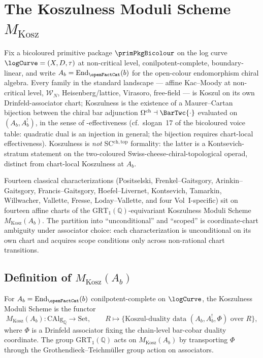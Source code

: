 \chapter{The Koszulness Moduli Scheme $M_{\mathrm{Kosz}}$}
\label{chap:koszulness-moduli}

Fix a bicoloured primitive package $\primPkgBicolour$ on the log curve
$\logCurve = (X, D, \tau)$ at non-critical level, conilpotent-complete,
boundary-linear, and write $A_b = \mathrm{End}_{\openFactCat}(b)$ for the
open-colour endomorphism chiral algebra. Every family in the standard
landscape — affine Kac--Moody at non-critical level, $\mathcal{W}_N$,
Heisenberg/lattice, Virasoro, free-field — is Koszul on its own
Drinfeld-associator chart; Koszulness is the existence of a Maurer--Cartan
bijection between the chiral bar adjunction $\Omega^{\mathrm{ch}} \dashv
\BarTwc{\cdot}$ evaluated on $(A_b, A_b^{!})$, in the sense of
\effKoszul-effectiveness (cf.\ slogan~17 of the bicoloured voice
table: quadratic dual is an injection in general; the bijection requires
chart-local effectiveness). Koszulness is \emph{not} SC$^{\mathrm{ch,top}}$
formality: the latter is a Kontsevich-stratum statement on the
two-coloured Swiss-cheese-chiral-topological operad, distinct from
chart-local Koszulness at $A_b$.
\par
Fourteen classical characterizations (Positselski, Frenkel--Gaitsgory,
Arinkin--Gaitsgory, Francis--Gaitsgory, Hoefel--Livernet, Kontsevich,
Tamarkin, Willwacher, Vallette, Fresse, Loday--Vallette, and four
Vol~I-specific) sit on fourteen affine charts of the
$\mathrm{GRT}_1(\mathbb{Q})$-equivariant Koszulness Moduli Scheme
$M_{\mathrm{Kosz}}(A_b)$. The partition into ``unconditional'' and
``scoped'' is coordinate-chart ambiguity under associator choice: each
characterization is unconditional on its own chart and acquires scope
conditions only across non-rational chart transitions.

\section{Definition of $M_{\mathrm{Kosz}}(A_b)$}
\label{sec:mkosz-definition}

\begin{definition}
\label{def:mkosz}
For $A_b = \mathrm{End}_{\openFactCat}(b)$ conilpotent-complete on
$\logCurve$, the Koszulness Moduli Scheme is the functor
\[
 M_{\mathrm{Kosz}}(A_b) :
 \mathrm{CAlg}_{\mathbb{Q}} \to \mathrm{Set},
 \qquad
 R \mapsto
 \{\text{Koszul-duality data } (A_b, A_b^{!}, \Phi) \text{ over } R\},
\]
where $\Phi$ is a Drinfeld associator fixing the chain-level bar-cobar
duality coordinate. The group $\mathrm{GRT}_1(\mathbb{Q})$ acts on
$M_{\mathrm{Kosz}}(A_b)$ by transporting $\Phi$ through the
Grothendieck--Teichm\"uller group action on associators.
\end{definition}

